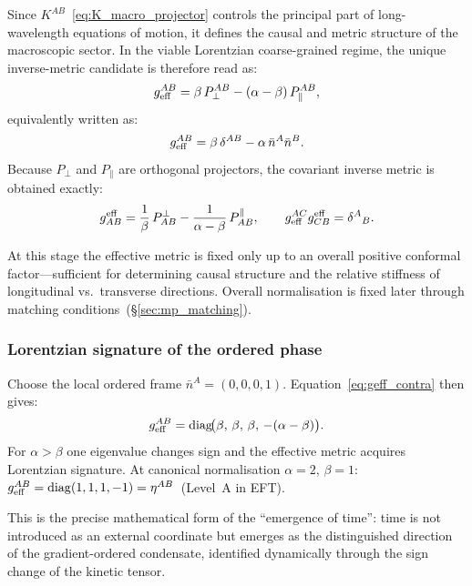 \documentclass[11pt,a4paper]{article}
\numberwithin{equation}{section}
\begin{document}
Since $K^{AB}$~\eqref{eq:K_macro_projector} controls the principal
part of long-wavelength equations of motion, it defines the causal and
metric structure of the macroscopic sector.
In the viable Lorentzian coarse-grained regime, the unique
inverse-metric candidate is therefore read as:
\begin{equation}
  \label{eq:geff_contra}
  g_{\rm eff}^{AB}
  = \beta\,P_\perp^{AB} - (\alpha-\beta)\,P_\parallel^{AB},
\end{equation}
equivalently written as:
\begin{equation}
  \label{eq:geff_contra_alt}
  g_{\rm eff}^{AB}
  = \beta\,\delta^{AB} - \alpha\,\bar{n}^A\bar{n}^B.
\end{equation}
Because $P_\perp$ and $P_\parallel$ are orthogonal projectors,
the covariant inverse metric is obtained exactly:
\begin{equation}
  \label{eq:geff_cov}
  g^{\rm eff}_{AB}
  = \frac{1}{\beta}\,P^\perp_{AB}
  - \frac{1}{\alpha-\beta}\,P^\parallel_{AB},
  \qquad
  g_{\rm eff}^{AC}g^{\rm eff}_{CB} = \delta^A{}_B.
\end{equation}

At this stage the effective metric is fixed only up to an overall
positive conformal factor—sufficient for determining causal structure
and the relative stiffness of longitudinal vs.\ transverse directions.
Overall normalisation is fixed later through matching
conditions~(\S\ref{sec:mp_matching}).

\subsubsection*{Lorentzian signature of the ordered phase}

Choose the local ordered frame $\bar{n}^A=(0,0,0,1)$.
Equation~\eqref{eq:geff_contra} then gives:
\begin{equation}
  \label{eq:geff_diag}
  g_{\rm eff}^{AB}
  = \operatorname{diag}\!\bigl(\beta,\,\beta,\,\beta,\,-(\alpha-\beta)\bigr).
\end{equation}
For $\alpha>\beta$ one eigenvalue changes sign and the effective metric
acquires Lorentzian signature.
At canonical normalisation $\alpha=2$, $\beta=1$:
$g_{\rm eff}^{AB}=\operatorname{diag}(1,1,1,-1)=\eta^{AB}$~(Level~A in EFT).

This is the precise mathematical form of the ``emergence of time'':
time is not introduced as an external coordinate but emerges as the
distinguished direction of the gradient-ordered condensate, identified
dynamically through the sign change of the kinetic tensor.
\end{document}
